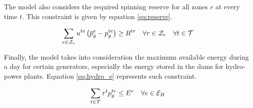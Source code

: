 The model also considers the required spinning reserve for all zones $r$ at every time $t$. This constraint is given by equation \ref{eq:reserve}.

\begin{equation}
\sum_{e \in {\cal{Z}}_{r}}{u^{te} \left( \overline{p}_{g}^{e} - p_{g}^{te} \right)} \ge R^{tr} \quad \forall r \in {\cal{Z}}_{r} \quad \forall t  \in {\cal{T}}
\label{eq:reserve}
\end{equation}

Finally, the model takes into consideration the maximum available energy during a day for certain generators, especially the energy stored in the dams for hydro-power plants. Equation \ref{eq:hydro_e} represents such constraint.

\begin{equation}
\sum_{t \in {\cal{T}}}{{\tau}^{t} p_{g}^{te}} \le E^{e} \quad \forall e \in {\cal{E}}_{H}
\label{eq:hydro_e}
\end{equation}

\newpage